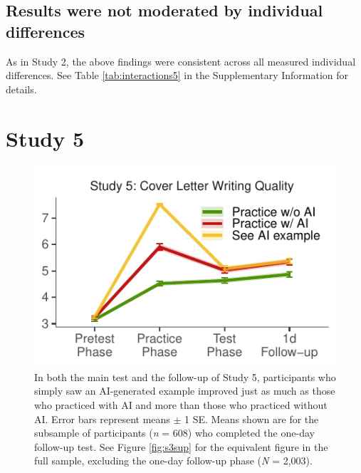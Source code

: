 \documentclass[11pt]{report}
\begin{document}
\begin{mainf}
\subsection*{Results were not moderated by individual differences}
As in Study 2, the above findings were consistent across all measured individual differences. See Table \ref{tab:interactions5} in the
Supplementary Information for details.

\section*{Study 5} 

\begin{figure}[t]
    \centering
    \includegraphics[width=\linewidth]{average_test_rewritten_lines_raw.pdf}
    \caption{
    In both the main test and the follow-up of Study 5, participants who simply saw an AI-generated example improved just as much as those who practiced with AI and more than those who practiced without AI.
    Error bars represent means $\pm$ 1 SE.
    Means shown are for the subsample of participants  (\textit{n} = 608) who completed the one-day follow-up test.
    See Figure \ref{fig:s3sup} for the equivalent figure in the full sample, excluding the one-day follow-up phase (\textit{N} = 2,003).}
    \label{fig:s3}
\end{figure}


\end{mainf}
\end{document}
